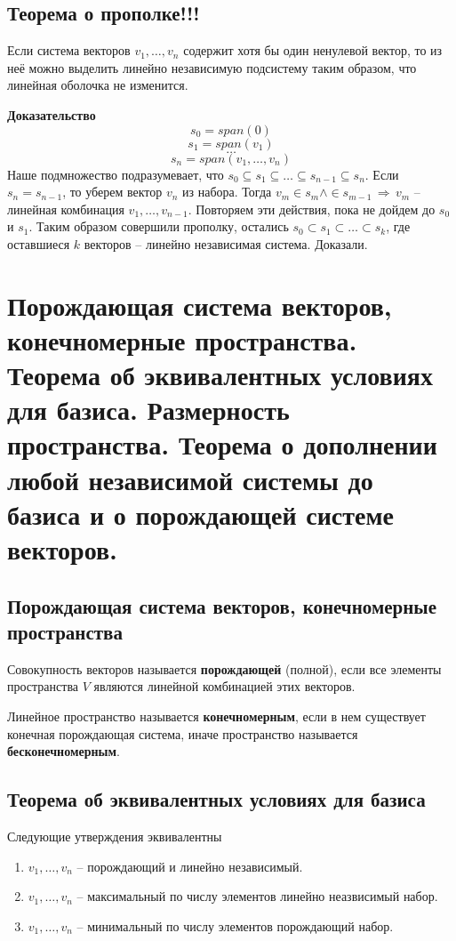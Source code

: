 \documentclass{article}
\begin{document}
\subsection{Теорема о прополке!!!}
Если система векторов $v_1,\ldots,v_n$ содержит хотя бы один ненулевой вектор, то из неё можно выделить линейно независимую подсистему таким образом, что линейная оболочка не изменится.

\textbf{Доказательство}
$$ s_0=span(0) $$
$$ s_1=span(v_1) $$
$$\ldots$$
$$ s_n=span(v_1,\ldots,v_n) $$
Наше подмножество подразумевает, что $s_0\subseteq s_1\subseteq \ldots \subseteq s_{n-1}\subseteq s_n$. Если $s_n=s_{n-1}$, то уберем вектор $v_n$ из набора. Тогда $v_m\in s_m \land \in s_{m-1} \,\Rightarrow\,v_m$ -- линейная комбинация $v_1,\ldots,v_{n-1}$. Повторяем эти действия, пока не дойдем до $s_0$ и $s_1$. Таким образом совершили прополку, остались $s_0\subset s_1\subset\ldots\subset s_k$, где оставшиеся $k$ векторов -- линейно независимая система. Доказали.

\newpage
\section{Порождающая система векторов, конечномерные пространства. Теорема об эквивалентных условиях для базиса. Размерность пространства. Теорема о дополнении любой независимой системы до базиса и о порождающей системе векторов.}
\subsection{Порождающая система векторов, конечномерные пространства}
Совокупность векторов называется \textbf{порождающей} (полной), если все элементы пространства $V$ являются линейной комбинацией этих векторов.

Линейное пространство называется \textbf{конечномерным}, если в нем существует конечная порождающая система, иначе пространство называется \textbf{бесконечномерным}.

\subsection{Теорема об эквивалентных условиях для базиса}
Следующие утверждения эквивалентны
\begin{enumerate}
    \item $v_1,\ldots,v_n$ -- порождающий и линейно независимый.
    \item $v_1,\ldots,v_n$ -- максимальный по числу элементов линейно неазвисимый набор.
    \item $v_1,\ldots,v_n$ -- минимальный по числу элементов порождающий набор.
\end{enumerate}
\end{document}
